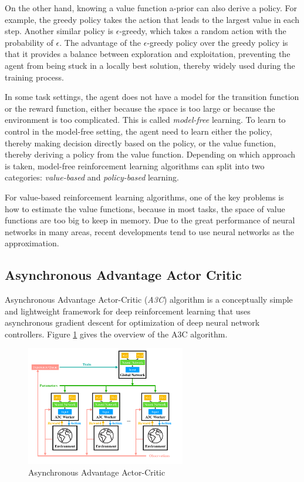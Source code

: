         On the other hand, knowing a value function a-prior can also derive a policy.
        For example, the greedy policy takes the action that leads to the largest value in each step.
        Another similar policy is $\epsilon$-greedy,
        which takes a random action with the probability of $\epsilon$.
        The advantage of the $\epsilon$-greedy policy over the greedy policy is that
        it provides a balance between exploration and exploitation,
        preventing the agent from being stuck in a locally best solution,
        thereby widely used during the training process.

        In some task settings,
        the agent does not have a model for the transition function or the reward function,
        either because the space is too large or because the environment is too complicated.
        This is called \emph{model-free} learning.
        To learn to control in the model-free setting, the agent need to learn either
        the policy, thereby making decision directly based on the policy,
        or the value function, thereby deriving a policy from the value function.
        Depending on which approach is taken,
        model-free reinforcement learning algorithms can split into two categories:
        \emph{value-based} and \emph{policy-based} learning.

        For value-based reinforcement learning algorithms,
        one of the key problems is how to estimate the value functions,
        because in most tasks, the space of value functions are too big to keep in memory.
        Due to the great performance of neural networks in many areas,
        recent developments tend to use neural networks as the approximation.

    \subsection{Asynchronous Advantage Actor Critic}

        Asynchronous Advantage Actor-Critic \cite{mnih_asynchronous_2016} (\emph{A3C}) algorithm is
        a conceptually simple and lightweight framework for deep reinforcement learning
        that uses asynchronous gradient descent for optimization of deep neural network controllers.
        Figure \ref{fig:a3c} gives the overview of the A3C algorithm.

        \begin{figure}[htp]
            \centering
            \includegraphics[width=0.62\textwidth]{img/a3c.pdf}
            \caption{Asynchronous Advantage Actor-Critic}
            \label{fig:a3c}
        \end{figure}

